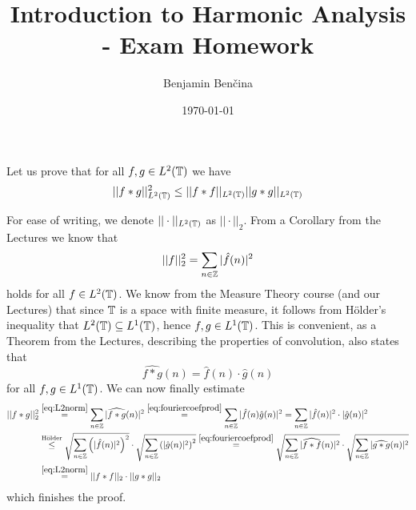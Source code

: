 \documentclass[a4paper, 12pt]{article}
\title{Introduction to Harmonic Analysis - Exam Homework}
\author{Benjamin Benčina}
\date{\today}
\begin{document}
\maketitle

\begin{Exercise}
    Let us prove that for all $f, g \in L^2(\mathbb{T})$ we have
    \[
        || f * g ||_{L^2(\mathbb{T})}^2 \leq ||f * f ||_{L^2(\mathbb{T})} ||g * g||_{L^2(\mathbb{T})}
    \]
    
    For ease of writing, we denote $|| \cdot ||_{L^2(\mathbb{T})}$ as $|| \cdot ||_2$.
    From a Corollary from the Lectures we know that
    \begin{equation}
        || f ||_2^2 = \sum_{n \in \mathbb{Z}} | \hat{f}(n) |^2
        \label{eq:L2norm}
    \end{equation}
    holds for all $f \in L^2(\mathbb{T})$.
    We know from the Measure Theory course (and our Lectures) that since $\mathbb{T}$
    is a space with finite measure, it follows from H\"older's inequality that
    $L^2(\mathbb{T}) \subseteq L^1(\mathbb{T})$, hence $f, g \in L^1(\mathbb{T})$.
    This is convenient, as a Theorem from the Lectures, describing the
    properties of convolution, also states that
    \begin{equation}
        \widehat{f * g}(n) = \hat{f}(n) \cdot \hat{g}(n)
        \label{eq:fouriercoefprod}
    \end{equation}
    for all $f, g \in L^1(\mathbb{T})$.
    We can now finally estimate
    \begin{align*}
        || f * g ||_2^2
        &\overset{\eqref{eq:L2norm}}{=} \sum_{n \in \mathbb{Z}} |\widehat{f * g}(n)|^2
        \overset{\eqref{eq:fouriercoefprod}}{=} \sum_{n \in \mathbb{Z}} | \hat{f}(n) \hat{g}(n) |^2
        = \sum_{n \in \mathbb{Z}} |\hat{f}(n)|^2 \cdot |\hat{g}(n)|^2 \\
        &\overset{\text{H\"older}}{\leq}
        \sqrt{\sum_{n \in \mathbb{Z}} \left( |\hat{f}(n)|^2 \right)^2} \cdot
        \sqrt{\sum_{n \in \mathbb{Z}} \left( |\hat{g}(n)|^2 \right)^2}
        \overset{\eqref{eq:fouriercoefprod}}{=}
        \sqrt{\sum_{n \in \mathbb{Z}} |\widehat{f * f}(n)|^2 } \cdot
        \sqrt{\sum_{n \in \mathbb{Z}} |\widehat{g * g}(n)|^2 } \\
        &\overset{\eqref{eq:L2norm}}{=} || f * f ||_2 \cdot || g * g ||_2
    \end{align*}
    which finishes the proof.
\end{Exercise}
\end{document}
